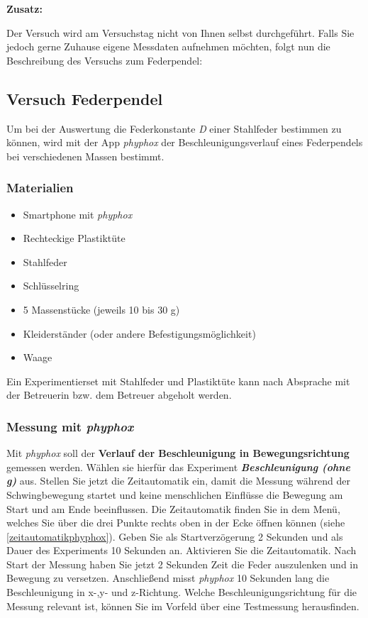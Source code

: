 \documentclass[12pt]{scrbook}
\begin{document}
\textbf{Zusatz:}

Der Versuch wird am Versuchstag nicht von Ihnen selbst durchgeführt. Falls Sie jedoch gerne Zuhause eigene Messdaten aufnehmen möchten, folgt nun die Beschreibung des Versuchs zum Federpendel:

\subsection{Versuch Federpendel}

Um bei der Auswertung die Federkonstante \textit{D} einer Stahlfeder bestimmen zu können, wird mit der App \textit{phyphox} der Beschleunigungsverlauf eines Federpendels bei verschiedenen Massen bestimmt.

\subsubsection{Materialien}
\begin{itemize}
    \item Smartphone mit \textit{phyphox}
    \item Rechteckige Plastiktüte
    \item Stahlfeder
    \item Schlüsselring 
    \item 5 Massenstücke (jeweils 10 bis 30 g)
    \item Kleiderständer (oder andere Befestigungsmöglichkeit)
    \item Waage
\end{itemize}

Ein Experimentierset mit Stahlfeder und Plastiktüte kann nach Absprache mit der Betreuerin bzw. dem Betreuer abgeholt werden.

\subsubsection{Messung mit \textit{phyphox}}

Mit \textit{phyphox} soll der \textbf{Verlauf der Beschleunigung in Bewegungsrichtung} gemessen werden.  Wählen sie hierfür das Experiment \textbf{\textit{Beschleunigung (ohne g)}} aus. Stellen Sie jetzt die Zeitautomatik ein, damit die Messung während der Schwingbewegung startet und keine menschlichen Einflüsse die Bewegung am Start und am Ende beeinflussen. Die Zeitautomatik finden Sie in dem Menü, welches Sie über die drei Punkte rechts oben in der Ecke öffnen können (siehe \autoref{zeitautomatikphyphox}). Geben Sie als Startverzögerung 2 Sekunden und als Dauer des Experiments 10 Sekunden an. Aktivieren Sie die Zeitautomatik. Nach Start der Messung haben Sie jetzt 2 Sekunden Zeit die Feder auszulenken und in Bewegung zu versetzen. Anschließend misst \textit{phyphox} 10 Sekunden lang die Beschleunigung in x-,y- und z-Richtung. Welche Beschleunigungsrichtung für die Messung relevant ist, können Sie im Vorfeld über eine Testmessung herausfinden.
\end{document}
